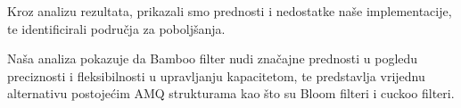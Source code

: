 \documentclass[seminarskirad]{fer}
\begin{document}
Kroz analizu rezultata, prikazali smo prednosti i nedostatke naše implementacije, te identificirali područja za poboljšanja. 

Naša analiza pokazuje da Bamboo filter nudi značajne prednosti u pogledu preciznosti i fleksibilnosti u upravljanju kapacitetom, te predstavlja vrijednu alternativu postojećim AMQ strukturama kao što su Bloom filteri i cuckoo filteri.





\end{document}
